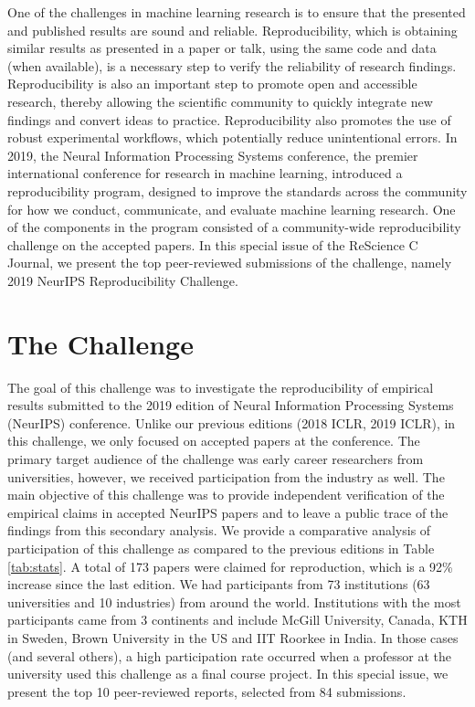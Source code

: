 One of the challenges in machine learning research is to ensure that the presented and
published results are sound and reliable. Reproducibility, which is obtaining similar results
as presented in a paper or talk, using the same code and data (when available), is a
necessary step to verify the reliability of research findings. Reproducibility is also an
important step to promote open and accessible research, thereby allowing the scientific
community to quickly integrate new findings and convert ideas to practice.
Reproducibility also promotes the use of robust experimental workflows, which
potentially reduce unintentional errors. In 2019, the Neural Information Processing
Systems conference, the premier international conference for research in machine
learning, introduced a reproducibility program, designed to improve the standards
across the community for how we conduct, communicate, and evaluate machine
learning research. One of the components in the program consisted of a community-wide reproducibility challenge on the accepted papers. In this special issue of the ReScience C Journal, we present the top peer-reviewed submissions of the challenge, namely 2019 NeurIPS Reproducibility Challenge.


\section{The Challenge} 

The goal of this challenge was to investigate the reproducibility of empirical results submitted to the 2019 edition of Neural Information Processing Systems (NeurIPS) conference. Unlike our previous editions (2018 ICLR, 2019 ICLR), in this challenge, we only focused on accepted papers at the conference. The primary target audience of the challenge was early career researchers from universities, however, we received participation from the industry as well. The main objective of this challenge was to provide independent verification of the empirical claims in accepted NeurIPS papers and to leave a public trace of the findings from this secondary analysis. We provide a comparative analysis of participation of this challenge as compared to the previous editions in Table \ref{tab:stats}. A total of 173 papers were claimed for reproduction, which is a 92\% increase since the last edition. We had participants from 73 institutions (63 universities and 10 industries) from around the world. Institutions with the most participants came from 3 continents and include McGill University, Canada, KTH in Sweden, Brown University in the US and IIT Roorkee in India. In those cases (and several others), a high participation rate occurred when a professor at the university used this challenge as a final course project. In this special issue, we present the top 10 peer-reviewed reports, selected from 84 submissions.


